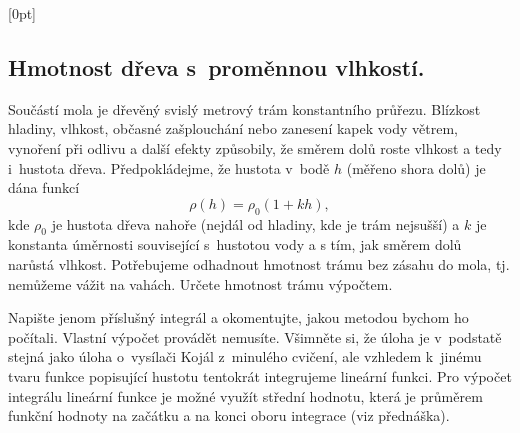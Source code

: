 \konec






\stranka

\def\mezera{\vspace*{10pt}}

[0pt]

\subsection{Hmotnost dřeva s proměnnou vlhkostí.} Součástí mola je dřevěný
svislý metrový trám konstantního průřezu.  Blízkost hladiny, vlhkost,
občasné zašplouchání nebo zanesení kapek vody větrem, vynoření při
odlivu a další efekty způsobily, že směrem dolů roste vlhkost a tedy
i hustota dřeva. Předpokládejme, že hustota v bodě $h$ (měřeno shora
dolů) je dána funkcí
$$\rho(h)=\rho_0(1+kh),$$
kde $\rho_0$ je hustota dřeva nahoře (nejdál od hladiny, kde je trám
nejsušší) a $k$ je konstanta úměrnosti související s hustotou vody a s
tím, jak směrem dolů narůstá vlhkost. Potřebujeme odhadnout hmotnost
trámu bez zásahu do mola, tj. nemůžeme vážit na vahách. Určete
hmotnost trámu výpočtem.

{\footnotesize
Napište jenom příslušný integrál a okomentujte, jakou metodou bychom
ho počítali. Vlastní výpočet provádět nemusíte. Všimněte si, že úloha
je v podstatě stejná jako úloha o vysílači Kojál z minulého cvičení,
ale vzhledem k jinému tvaru funkce popisující hustotu tentokrát integrujeme
lineární funkci. Pro výpočet integrálu lineární funkce je možné využít
střední hodnotu, která je průměrem funkční hodnoty na začátku a na
konci oboru integrace (viz přednáška).

}









\stranka

\def\mezera{\vspace*{-20pt}}

